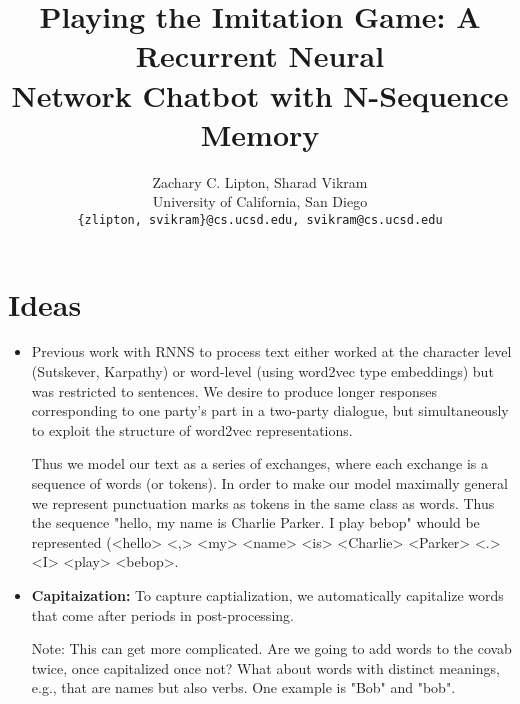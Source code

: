 \documentclass[]{article}
\begin{document}
\title{Playing the Imitation Game:  A Recurrent Neural \\
 Network Chatbot with N-Sequence Memory}

\author{Zachary C. Lipton, Sharad Vikram\\
University of California, San Diego\\
\texttt{\{zlipton, svikram\}@cs.ucsd.edu, svikram@cs.ucsd.edu}
}

\begin{abstract}

\end{abstract}

\section{Ideas}

\begin{itemize}

\item Previous work with RNNS to process text either worked at the character level (Sutskever, Karpathy) or word-level (using word2vec type embeddings) but was restricted to sentences. We desire to produce longer responses corresponding to one party's part in a two-party dialogue, but simultaneously to exploit the structure of word2vec representations.

Thus we model our text as a series of exchanges, where each exchange is a sequence of words (or tokens). In order to make our model maximally general we represent punctuation marks as tokens in the same class as words. Thus the sequence "hello, my name is Charlie Parker. I play bebop" whould be represented (<hello> <,> <my> <name> <is> <Charlie> <Parker> <.> <I> <play> <bebop>.

\item \textbf{Capitaization:} To capture captialization, we automatically capitalize words that come after periods in post-processing.

Note: This can get more complicated. Are we going to add words to the covab twice, once capitalized once not? What about words with distinct meanings, e.g., that are names but also verbs. One example is "Bob" and "bob".

\end{itemize}


\end{document}
